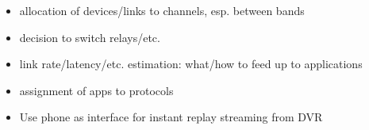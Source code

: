 \begin{itemize}
\item allocation of devices/links to channels, esp. between bands
\item decision to switch relays/etc.
\item link rate/latency/etc. estimation: what/how to feed up to applications
\item assignment of apps to protocols
\end{itemize}

\begin{itemize}
\item Use phone as interface for instant replay streaming from DVR
\end{itemize}